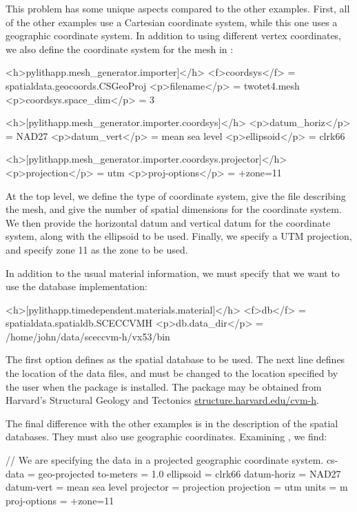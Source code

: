 This problem has some unique aspects compared to the other examples.
First, all of the other examples use a Cartesian coordinate system,
while this one uses a geographic coordinate system. In addition to
using different vertex coordinates, we also define the coordinate
system for the mesh in :
\begin{cfg}
<h>pylithapp.mesh_generator.importer]</h>
<f>coordsys</f> = spatialdata.geocoords.CSGeoProj
<p>filename</p> = twotet4.mesh
<p>coordsys.space_dim</p> = 3

<h>[pylithapp.mesh_generator.importer.coordsys]</h>
<p>datum_horiz</p> = NAD27
<p>datum_vert</p> = mean sea level
<p>ellipsoid</p> = clrk66

<h>[pylithapp.mesh\_generator.importer.coordsys.projector]</h>
<p>projection</p> = utm
<p>proj-options</p> = +zone=11
\end{cfg}
At the top level, we define the type of coordinate system, give the
file describing the mesh, and give the number of spatial dimensions
for the coordinate system. We then provide the horizontal datum and
vertical datum for the coordinate system, along with the ellipsoid
to be used. Finally, we specify a UTM projection, and specify zone
11 as the zone to be used.

In addition to the usual material information, we must specify that
we want to use the  database implementation:
\begin{cfg}
<h>[pylithapp.timedependent.materials.material]</h>
<f>db</f> = spatialdata.spatialdb.SCECCVMH
<p>db.data_dir</p> = /home/john/data/sceccvm-h/vx53/bin
\end{cfg}
The first  option defines  as the
spatial database to be used. The next line defines the location of the
 data files, and must be changed to the location
specified by the user when the package is installed. The package may
be obtained from Harvard's Structural Geology and Tectonics
\url{structure.harvard.edu/cvm-h}.

The final difference with the other examples is in the description of
the spatial databases. They must also use geographic coordinates.
Examining , we find:
\begin{SimpleIOAscii}
// We are specifying the data in a projected geographic coordinate system.
cs-data = geo-projected {
  to-meters = 1.0
  ellipsoid = clrk66
  datum-horiz = NAD27
  datum-vert = mean sea level
  projector = projection {
    projection = utm
    units = m
    proj-options = +zone=11
  }
}
\end{SimpleIOAscii}


